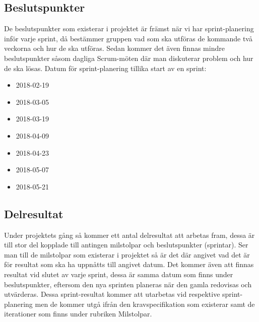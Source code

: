 \documentclass[a4paper,10pt]{article}
\begin{document}
\subsection{Beslutspunkter}
De beslutspunkter som existerar i projektet är främst när vi har sprint-planering inför varje sprint, då bestämmer gruppen vad som ska utföras de kommande två veckorna och hur de ska utföras. Sedan kommer det även finnas mindre beslutspunkter såsom dagliga Scrum-möten där man diskuterar problem och hur de ska lösas.
Datum för sprint-planering tillika start av en sprint:
\begin{itemize}
\item 2018-02-19
\item 2018-03-05
\item 2018-03-19
\item 2018-04-09
\item 2018-04-23
\item 2018-05-07
\item 2018-05-21
\end{itemize}
\subsection{Delresultat}
Under projektets gång så kommer ett antal delresultat att arbetas fram, dessa är till stor del kopplade till antingen milstolpar och beslutspunkter (sprintar). Ser man till de milstolpar som existerar i projektet så är det där angivet vad det är för resultat som ska ha uppnåtts till angivet datum. Det kommer även att finnas resultat vid slutet av varje sprint, dessa är samma datum som finns under beslutspunkter, eftersom den nya sprinten planeras när den gamla redovisas och utvärderas. Dessa sprint-resultat kommer att utarbetas vid respektive sprint-planering men de kommer utgå ifrån den kravspecifikation som existerar samt de iterationer som finns under rubriken Milstolpar.
\end{document}
